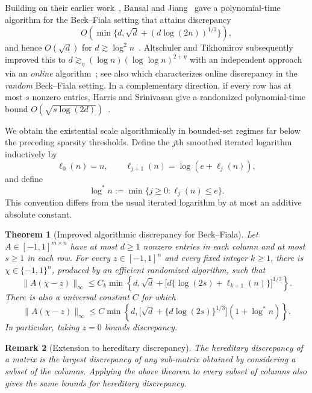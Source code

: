 \documentclass[10pt,a4paper]{amsart}
\newtheorem{theorem}{Theorem}[section]
\newtheorem{remark}[theorem]{Remark}
\newcommand{\norm}[1]{\lVert#1\rVert}
\newcommand{\lstar}{\log^*}
\begin{document}
Building on their earlier work~\cite{BJearly}, Bansal and Jiang~\cite{BJ} gave a polynomial-time algorithm for the Beck--Fiala setting that attains discrepancy
\begin{equation}\label{eq:BJ} O\!\left(\min\{d,\sqrt d+(d\log(2n))^{1/3}\}\right), \end{equation}
and hence $O(\sqrt d)$ for $d\gtrsim\log^2n$~\cite[Theorem~5.1]{BJ}. Altschuler and Tikhomirov subsequently improved this to $d\gtrsim_\eta(\log n)(\log\log n)^{2+\eta}$ with an independent approach via an \textit{online} algorithm~\cite{AT}; see also \cite{AT2} which characterizes online discrepancy in the \textit{random} Beck--Fiala setting.  In a complementary direction, if every row has at most $s$ nonzero entries, Harris and Srinivasan give a randomized polynomial-time bound $O(\sqrt{s\log(2d)})$~\cite[Theorem~5.2]{HS}.

We obtain the existential scale algorithmically in bounded-set regimes far below the preceding sparsity thresholds. Define the $j$th smoothed iterated logarithm inductively by
\begin{equation}\label{eq:logs} \ell_0(n)=n, \qquad \ell_{j+1}(n)=\log(e+\ell_j(n)), \end{equation}
and define
\[ \lstar n:=\min\{j\ge0:\ell_j(n)\le e\}. \]
This convention differs from the usual iterated logarithm by at most an additive absolute constant.


\begin{theorem}[Improved algorithmic discrepancy for Beck--Fiala]\label{thm:main}
Let $A\in[-1,1]^{m\times n}$ have at most $d\ge1$ nonzero entries in each column and at most $s\ge1$ in each row.  For every $z\in[-1,1]^n$ and every fixed integer $k\ge1$, there is $\chi\in\{-1,1\}^n$, produced by an efficient randomized algorithm, such that
\begin{equation}\label{eq:fixed} \norm{A(\chi-z)}_\infty \le C_k\min\!\left\{d,\sqrt d+ \bigl[d\{\log(2s)+\ell_{k+1}(n)\}\bigr]^{1/3}\right\}. \end{equation}
There is also a universal constant $C$ for which
\begin{equation}\label{eq:uniform} \norm{A(\chi-z)}_\infty \le C\min\!\left\{d, \bigl[\sqrt d+\{d\log(2s)\}^{1/3}\bigr](1+\lstar n)\right\}. \end{equation}
In particular, taking $z=0$ bounds discrepancy.
\end{theorem}



\begin{remark}[Extension to hereditary discrepancy]
The \textit{hereditary discrepancy} of a matrix is the largest discrepancy of any sub-matrix obtained by considering a subset of the columns. Applying the above theorem to every subset of columns also gives the same bounds for hereditary discrepancy.
\end{remark}
\end{document}
